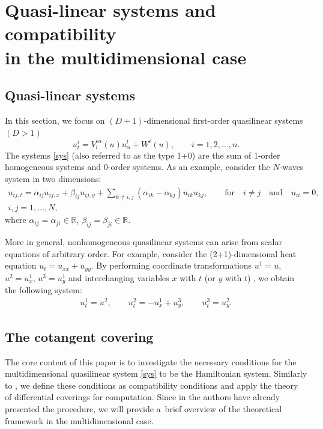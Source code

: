 \documentclass[pdftex]{sigma}
\numberwithin{equation}{section}
\begin{document}
\section[Quasi-linear systems and compatibility in the multidimensional case]{Quasi-linear systems and compatibility\\ in the multidimensional case}
\subsection{Quasi-linear systems}
In this section, we focus on $(D+1)$-dimensional first-order quasilinear systems $(D>1)$
\begin{equation}\label{sys}
u^i_t=V^{i\alpha}_l(u)u^l_\alpha+W^i(u), \qquad i=1,2,\dots, n.
\end{equation}
The systems \eqref{sys} (also referred to as the type 1+0) are the sum of 1-order homogeneous systems and 0-order systems. As an example, consider the $N$-waves system \cite{ablowitz1975nonlinear} in two dimensions:
\begin{gather}
u_{ij,t}=\alpha_{ij}u_{ij,x}+\beta_{ij}u_{ij,y}+\sum_{k\neq i,j}(\alpha_{ik}-\alpha_{kj})u_{ik}u_{kj},\qquad
\text{for}\quad i\neq j\quad \text{and}\quad u_{ii}=0, \nonumber \\
 i,j=1,\dots,N,\label{N-W}
\end{gather}
where $\alpha_{ij}=\alpha_{ji}\in\mathbb{R}$, $\beta_{ij}=\beta_{ji}\in\mathbb{R}$.


More in general, nonhomogeneous quasilinear systems can arise from scalar equations of arbitrary order. For example, consider the (2+1)-dimensional heat equation $u_t=u_{xx}+u_{yy}$. By performing coordinate transformations $u^1=u$, $u^2=u^1_x$, $u^3=u^1_y$ and interchanging variables $x$ with $t$ (or $y$ with $t$) \cite{tsarev1989hamilton}, we obtain the following system:
\begin{gather*}
u^1_t=u^2,\qquad
u^2_t=-u^1_x+u^3_y,\qquad
u^3_t=u^2_y.
\end{gather*}

\subsection{The cotangent covering}
The core content of this paper is to investigate the necessary conditions for the multidimensional quasilinear system \eqref{sys} to be the Hamiltonian system. Similarly to \cite{vergallo2023non}, we define these conditions as compatibility conditions and apply the theory of differential coverings \cite{krasil1989nonlocal} for computation. Since in \cite{vergallo2021homogeneous} the authors have already presented the procedure, we will provide a~brief overview of the theoretical framework in the multidimensional case.
\end{document}
